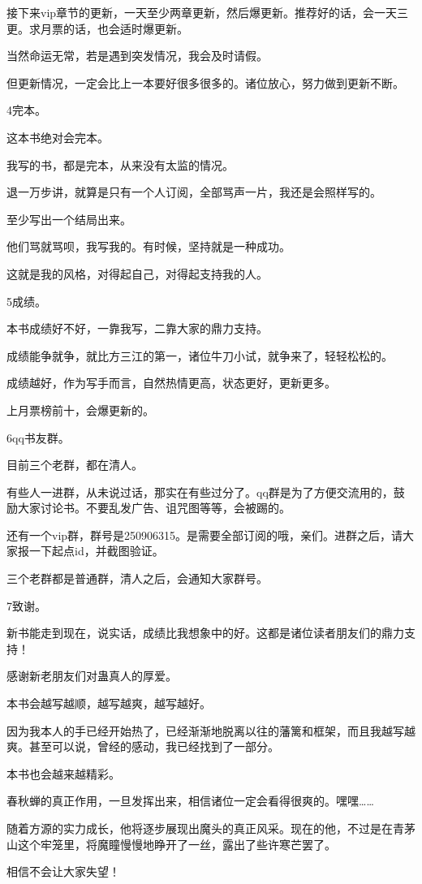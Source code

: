 \begin{this_body}
接下来vip章节的更新，一天至少两章更新，然后爆更新。推荐好的话，会一天三更。求月票的话，也会适时爆更新。

当然命运无常，若是遇到突发情况，我会及时请假。

但更新情况，一定会比上一本要好很多很多的。诸位放心，努力做到更新不断。

4完本。

这本书绝对会完本。

我写的书，都是完本，从来没有太监的情况。

退一万步讲，就算是只有一个人订阅，全部骂声一片，我还是会照样写的。

至少写出一个结局出来。

他们骂就骂呗，我写我的。有时候，坚持就是一种成功。

这就是我的风格，对得起自己，对得起支持我的人。

5成绩。

本书成绩好不好，一靠我写，二靠大家的鼎力支持。

成绩能争就争，就比方三江的第一，诸位牛刀小试，就争来了，轻轻松松的。

成绩越好，作为写手而言，自然热情更高，状态更好，更新更多。

上月票榜前十，会爆更新的。

6qq书友群。

目前三个老群，都在清人。

有些人一进群，从未说过话，那实在有些过分了。qq群是为了方便交流用的，鼓励大家讨论书。不要乱发广告、诅咒图等等，会被踢的。

还有一个vip群，群号是250906315。是需要全部订阅的哦，亲们。进群之后，请大家报一下起点id，并截图验证。

三个老群都是普通群，清人之后，会通知大家群号。

7致谢。

新书能走到现在，说实话，成绩比我想象中的好。这都是诸位读者朋友们的鼎力支持！

感谢新老朋友们对蛊真人的厚爱。

本书会越写越顺，越写越爽，越写越好。

因为我本人的手已经开始热了，已经渐渐地脱离以往的藩篱和框架，而且我越写越爽。甚至可以说，曾经的感动，我已经找到了一部分。

本书也会越来越精彩。

春秋蝉的真正作用，一旦发挥出来，相信诸位一定会看得很爽的。嘿嘿……

随着方源的实力成长，他将逐步展现出魔头的真正风采。现在的他，不过是在青茅山这个牢笼里，将魔瞳慢慢地睁开了一丝，露出了些许寒芒罢了。

相信不会让大家失望！

\end{this_body}


